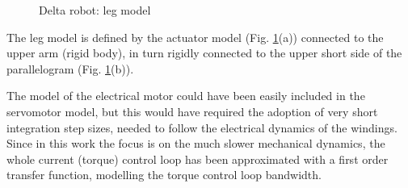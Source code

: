 \documentclass[]{interact}
\theoremstyle{plain}%
\theoremstyle{definition}
\theoremstyle{remark}
\begin{document}
{\begin{figure}
{}
\caption{Delta robot: leg model} \label{Fig:Delta_robot_Modelica_leg_model}
\end{figure}
The leg model is defined by the actuator model (Fig. \ref{Fig:Delta_robot_Modelica_leg_model}(a)) connected to the upper arm (rigid body), in turn rigidly connected to the upper short side of the parallelogram (Fig. \ref{Fig:Delta_robot_Modelica_leg_model}(b)).

The model of the electrical motor could have been easily included \cite{FMRBM2002} in the servomotor model, but this would have required the adoption of very short integration step sizes, needed to follow the electrical dynamics of the windings. Since in this work the focus is on the much slower mechanical dynamics, the whole current (torque) control loop has been approximated with a first order transfer function, modelling the torque control loop bandwidth.

}
\end{document}
